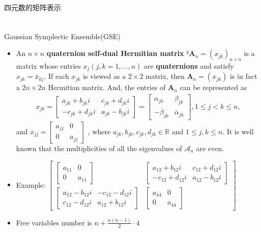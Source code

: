 \documentclass[UTF8,AutoFakeBold,AutoFakeSlant]{beamer}
\begin{document}
\begin{frame}{四元数的矩阵表示}
\begin{align*}
\begin{split}
        \end{split}
    \end{align*}
\end{frame}

\begin{frame}{Gaussian Symplectic Ensemble(GSE)}
    \begin{itemize}
        \scriptsize
        \item An $n\times n$ \textbf{quaternion self-dual Hermitian matrix} $^q\mathbf{A}_n=(x_{jk})_{n\times n}$ is a matrix whose entries $x_j(j,k=1,\ldots,n)$ are \textbf{quaternions} and satisfy $x_{jk}=\bar{x}_{kj}.$ If each $x_{jk}$ is viewed as a $2\times2$ matrix, then $\mathbf{A}_n=(x_{jk})$ is in fact a $2n\times2n$ Hermitian matrix. And, the entries of $\mathbf{A}_n$ can be represented as
              \begin{align*}
                  x_{jk}=\begin{bmatrix}a_{jk}+b_{jk}i&c_{jk}+d_{jk}i\\-c_{jk}+d_{jk}i&a_{jk}-b_{jk}i\end{bmatrix}=\begin{bmatrix}\alpha_{jk}&\beta_{jk}\\-\overline{\beta}_{jk}&\overline{\alpha}_{jk}\end{bmatrix},1\leq j<k\leq n,
              \end{align*}
              and $x_{jj}=\begin{bmatrix}a_{jj}&0\\0&a_{jj}\end{bmatrix}$ , where $a_{jk},b_{jk},c_{jk},d_{jk}\in\mathbb{R}$ and $1\leq j,k\leq n$. It is well known that the multiplicities of all the eigenvalues of $\mathcal{A}_n$ are even.
        \item Example: $\begin{bmatrix}
                      \begin{bmatrix}a_{11}&0\\0&a_{11}\end{bmatrix}                                            & \begin{bmatrix}a_{12}+b_{12}i&c_{12}+d_{12}i\\-c_{12}+d_{12}i&a_{12}-b_{12}i\end{bmatrix} \\
                      \begin{bmatrix}a_{12}-b_{12}i&-c_{12}-d_{12}i\\c_{12}-d_{12}i&a_{12}+b_{12}i\end{bmatrix} & \begin{bmatrix}a_{44}&0\\0&a_{44}\end{bmatrix}
                  \end{bmatrix}$
        \item Free variables number is $n+\frac{n(n-1)}{2}\cdot 4$
    \end{itemize}
\end{frame}
\end{document}
